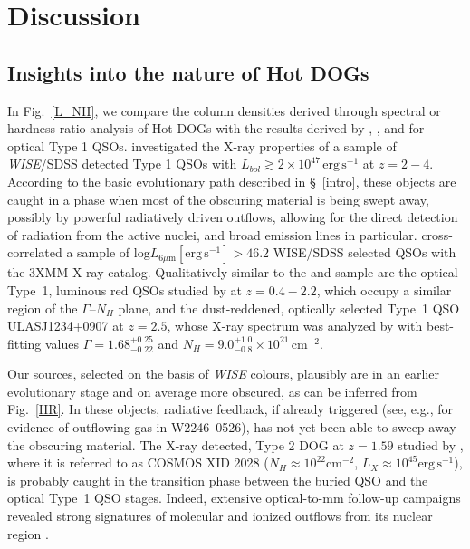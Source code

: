 \documentclass[useAMS,usenatbib]{mnras}
\newcommand*{\lunit}{\ensuremath{\mathrm{erg\,s^{-1}}}}
\newcommand*{\nhunits}{\mathrm{cm^{-2}}}
\begin{document}
\section{Discussion}\label{conclusions}
\subsection{Insights into the nature of Hot DOGs}


In Fig.~\ref{L_NH}, we compare the column densities derived through spectral or hardness-ratio analysis of Hot DOGs
 with the results derived by \cite{Urrutia05}, \cite{Martocchia17}, and \cite{Mountrichas17} for optical Type 1 QSOs. \cite{Martocchia17} investigated the X-ray properties of a sample of \textit{WISE}/SDSS detected Type 1 QSOs with \mbox{$L_{bol}\gtrsim2\times10^{47}\,\lunit$} at $z=2-4$. According to the basic evolutionary path described in \S~\ref{intro}, these objects are caught in a phase when most of the obscuring material is being swept away, possibly by powerful radiatively driven outflows, allowing for the direct detection of radiation from the active nuclei, and broad emission lines in particular. \cite{Mountrichas17} cross-correlated a sample of log$L_{6\mu\mathrm{m}}\mathrm{[erg\,s^{-1}]}>46.2$ WISE/SDSS selected QSOs with the 3XMM X-ray catalog. 
  Qualitatively similar to the \cite{Martocchia17} and  \cite{Mountrichas17} sample are the optical Type~1, luminous red QSOs studied by \cite{Urrutia05} at $z=0.4-2.2$, which occupy a similar region of the $\Gamma$--$N_H$ plane, and the dust-reddened, optically selected Type~1 QSO ULASJ1234+0907 at $z=2.5$, whose X-ray spectrum was analyzed by \cite{Banerji14} with best-fitting values $\Gamma=1.68^{+0.25}_{-0.22}$ and $N_H=9.0^{+1.0}_{-0.8}\times10^{21}\,\nhunits$.


Our sources, selected on the basis of \textit{WISE} colours, plausibly are in an earlier evolutionary stage and on average more obscured, as can be inferred from Fig.~\ref{HR}.  In these objects, radiative feedback, if already triggered (see, e.g., \citealt{Diaz-Santos16} for evidence of outflowing gas in W2246--0526), has not yet been able to sweep away the obscuring material. The X-ray detected, Type 2 DOG at $z=1.59$ studied by \cite{Brusa10}, where it is referred to as COSMOS XID 2028 ($N_H\approx10^{22}\nhunits$, $L_X\approx10^{45}\lunit$), is probably caught in the transition phase between the buried QSO and the optical Type~1 QSO stages. Indeed, extensive optical-to-mm follow-up campaigns revealed strong signatures of molecular and ionized outflows from its nuclear region \citep{Brusa15,Brusa15b,Brusa16}.
\end{document}

